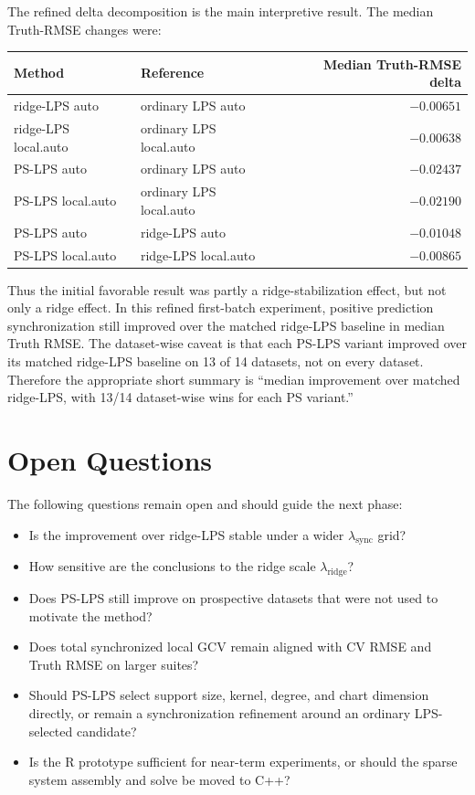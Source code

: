 \documentclass[11pt]{article}
\begin{document}
The refined delta decomposition is the main interpretive result.  The median
Truth-RMSE changes were:
\begin{center}
\begin{tabular}{@{}llr@{}}
\toprule
Method & Reference & Median Truth-RMSE delta \\
\midrule
ridge-LPS auto & ordinary LPS auto & \(-0.00651\) \\
ridge-LPS local.auto & ordinary LPS local.auto & \(-0.00638\) \\
PS-LPS auto & ordinary LPS auto & \(-0.02437\) \\
PS-LPS local.auto & ordinary LPS local.auto & \(-0.02190\) \\
PS-LPS auto & ridge-LPS auto & \(-0.01048\) \\
PS-LPS local.auto & ridge-LPS local.auto & \(-0.00865\) \\
\bottomrule
\end{tabular}
\end{center}
Thus the initial favorable result was partly a ridge-stabilization effect, but
not only a ridge effect.  In this refined first-batch experiment, positive
prediction synchronization still improved over the matched ridge-LPS baseline
in median Truth RMSE.  The dataset-wise caveat is that each PS-LPS variant
improved over its matched ridge-LPS baseline on 13 of 14 datasets, not on every
dataset.  Therefore the appropriate short summary is ``median improvement over
matched ridge-LPS, with 13/14 dataset-wise wins for each PS variant.''

\section{Open Questions}

The following questions remain open and should guide the next phase:
\begin{itemize}[leftmargin=*]
  \item Is the improvement over ridge-LPS stable under a wider
    \(\lambda_{\mathrm{sync}}\) grid?
  \item How sensitive are the conclusions to the ridge scale
    \(\lambda_{\mathrm{ridge}}\)?
  \item Does PS-LPS still improve on prospective datasets that were not used to
    motivate the method?
  \item Does total synchronized local GCV remain aligned with CV RMSE and Truth
    RMSE on larger suites?
  \item Should PS-LPS select support size, kernel, degree, and chart dimension
    directly, or remain a synchronization refinement around an ordinary
    LPS-selected candidate?
  \item Is the R prototype sufficient for near-term experiments, or should the
    sparse system assembly and solve be moved to C++?
\end{itemize}
\end{document}
